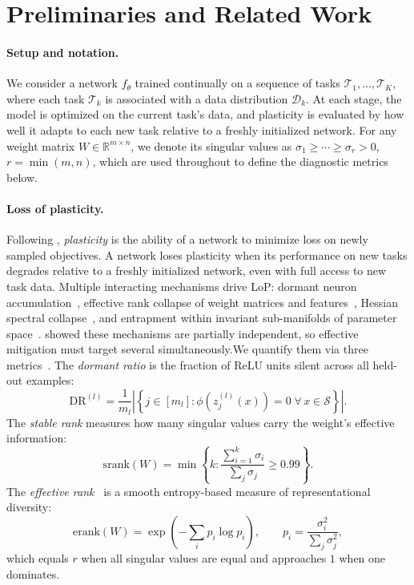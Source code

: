 \documentclass{article}
\newcommand{\RR}{\mathbb{R}}
\newcommand{\cT}{\mathcal{T}}
\begin{document}
\section{Preliminaries and Related Work}
\label{sec:background}

\paragraph{Setup and notation.}
We consider a network $f_\theta$ trained continually on a sequence of tasks
$\cT_1, \ldots, \cT_K$, where each task $\cT_k$ is associated with a data
distribution $\mathcal{D}_k$. At each stage, the model is optimized on the
current task's data, and plasticity is evaluated by how well it adapts to each
new task relative to a freshly initialized network. For any weight matrix
$W \in \RR^{m \times n}$, we denote its singular values as
$\sigma_1 \geq \cdots \geq \sigma_r > 0$, $r = \min(m, n)$, which are used
throughout to define the diagnostic metrics below.

\paragraph{Loss of plasticity.}
Following \citet{lyle2023understanding}, \emph{plasticity} is the ability of a
network to minimize loss on newly sampled objectives. A network loses plasticity
when its performance on new tasks degrades relative to a freshly initialized
network, even with full access to new task data. Multiple interacting mechanisms
drive LoP: dormant neuron accumulation~\citep{sokar2023dormant}, effective rank
collapse of weight matrices and features~\citep{he2024spectral}, Hessian
spectral collapse~\citep{lewandowski2024curvature}, and entrapment within
invariant sub-manifolds of parameter space~\citep{joudaki2026barriers}.
\citet{lyle2025disentangling} showed these mechanisms are partially independent,
so effective mitigation must target several simultaneously.We quantify them via three metrics~\citep{dohare2024loss}. The \emph{dormant
ratio} is the fraction of ReLU units silent across all held-out examples:
\[
    \mathrm{DR}^{(l)} = \frac{1}{m_l}\left|\left\{j \in [m_l] :
    \phi\!\left(z_j^{(l)}(x)\right) = 0 \;\forall\, x \in \mathcal{S}
    \right\}\right|.
\]
The \emph{stable rank} measures how many singular values carry the weight's
effective information:
\[
    \mathrm{srank}(W) = \min\!\left\{k :
    \frac{\sum_{i=1}^{k} \sigma_i}{\sum_j \sigma_j} \geq 0.99 \right\}.
\]
The \emph{effective rank}~\citep{roy2019theory} is a smooth entropy-based
measure of representational diversity:
\[
    \mathrm{erank}(W) = \exp\!\left(-\sum_i p_i \log p_i\right),
    \qquad p_i = \frac{\sigma_i^2}{\sum_j \sigma_j^2},
\]
which equals $r$ when all singular values are equal and approaches $1$ when
one dominates.
\end{document}
